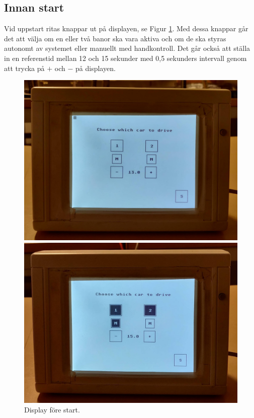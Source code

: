 \subsection{Innan start}

Vid uppstart ritas knappar ut på displayen, se Figur \ref{fig:choose}. Med dessa knappar går
det att välja om en eller två banor ska vara aktiva och om de ska styras
autonomt av systemet eller manuellt med handkontroll. Det går också att ställa
in en referenstid mellan 12 och 15 sekunder med 0,5 sekunders intervall genom
att trycka på $+$ och $-$ på displayen. 
\begin{figure}
	\centering
	\includegraphics[width=0.75\linewidth] {Figures/choose1}

	\vspace*{2\floatsep}%

	\centering
	\includegraphics [width=0.75\linewidth] {Figures/choose2}
	\caption{Display före start.}
	\label{fig:choose}
\end{figure}
